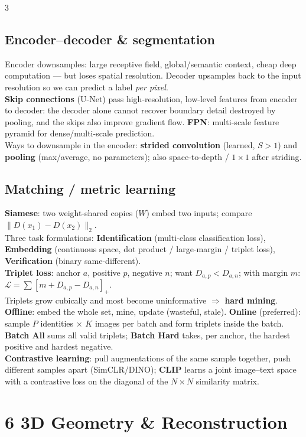 \documentclass[9pt,a4paper,landscape]{extarticle}
\newcommand{\key}[1]{\textbf{#1}}
\begin{document}
\begin{multicols}{3}
\subsection{Encoder--decoder \& segmentation}
Encoder downsamples: large receptive field, global/semantic context, cheap deep computation --- but loses spatial resolution. Decoder upsamples back to the input resolution so we can predict a label \emph{per pixel}.\\
\key{Skip connections} (U-Net) pass high-resolution, low-level features from encoder to decoder: the decoder alone cannot recover boundary detail destroyed by pooling, and the skips also improve gradient flow. \key{FPN}: multi-scale feature pyramid for dense/multi-scale prediction.\\
Ways to downsample in the encoder: \key{strided convolution} (learned, $S>1$) and \key{pooling} (max/average, no parameters); also space-to-depth / $1\times1$ after striding.

\subsection{Matching / metric learning}
\key{Siamese}: two weight-shared copies ($W$) embed two inputs; compare $\|D(x_1)-D(x_2)\|_2$.\\
Three task formulations: \key{Identification} (multi-class classification loss), \key{Embedding} (continuous space, dot product / large-margin / triplet loss), \key{Verification} (binary same-different).\\
\key{Triplet loss}: anchor $a$, positive $p$, negative $n$; want $D_{a,p}<D_{a,n}$; with margin $m$: $\mathcal L=\sum[m+D_{a,p}-D_{a,n}]_+$.\\
Triplets grow cubically and most become uninformative $\Rightarrow$ \key{hard mining}. \key{Offline}: embed the whole set, mine, update (wasteful, stale). \key{Online} (preferred): sample $P$ identities $\times$ $K$ images per batch and form triplets inside the batch. \key{Batch All} sums all valid triplets; \key{Batch Hard} takes, per anchor, the hardest positive and hardest negative.\\
\key{Contrastive learning}: pull augmentations of the same sample together, push different samples apart (SimCLR/DINO); \key{CLIP} learns a joint image--text space with a contrastive loss on the diagonal of the $N\times N$ similarity matrix.

\section{6 \; 3D Geometry \& Reconstruction}


\end{multicols}
\end{document}
